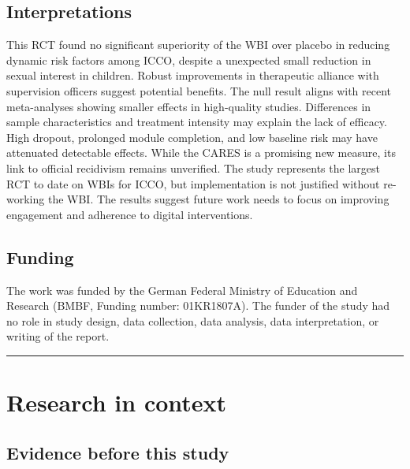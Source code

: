 \documentclass[
  super,
  preprint,
  1p,
  onecolumn]{elsarticle}
\begin{document}
\subsection*{Interpretations}\label{interpretations}

This RCT found no significant superiority of the WBI \citet{myTabu} over
placebo in reducing dynamic risk factors among ICCO, despite a
unexpected small reduction in sexual interest in children. Robust
improvements in therapeutic alliance with supervision officers suggest
potential benefits. The null result aligns with recent meta-analyses
showing smaller effects in high-quality studies. Differences in sample
characteristics and treatment intensity may explain the lack of
efficacy. High dropout, prolonged module completion, and low baseline
risk may have attenuated detectable effects. While the CARES is a
promising new measure, its link to official recidivism remains
unverified. The study represents the largest RCT to date on WBIs for
ICCO, but implementation is not justified without re-working the WBI.
The results suggest future work needs to focus on improving engagement
and adherence to digital interventions.

\subsection*{Funding}\label{funding}

The work was funded by the German Federal Ministry of Education and
Research (BMBF, Funding number: 01KR1807A). The funder of the study had
no role in study design, data collection, data analysis, data
interpretation, or writing of the report.

\begin{center}\rule{0.5\linewidth}{0.5pt}\end{center}

\newpage{}

\section*{Research in context}\label{research-in-context}

\subsection*{Evidence before this
study}\label{evidence-before-this-study}
\end{document}
